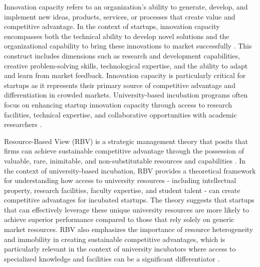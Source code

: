 \documentclass[../Main.tex]{subfiles}
\begin{document}
Innovation capacity refers to an organization's ability to generate, develop, and implement new ideas, products, services, or processes that create value and competitive advantage. In the context of startups, innovation capacity encompasses both the technical ability to develop novel solutions and the organizational capability to bring these innovations to market successfully \autocite{lawson2001developing, hurley1998innovation}. This construct includes dimensions such as research and development capabilities, creative problem-solving skills, technological expertise, and the ability to adapt and learn from market feedback. Innovation capacity is particularly critical for startups as it represents their primary source of competitive advantage and differentiation in crowded markets. University-based incubation programs often focus on enhancing startup innovation capacity through access to research facilities, technical expertise, and collaborative opportunities with academic researchers \autocite{grimaldi2005university}.

Resource-Based View (RBV) is a strategic management theory that posits that firms can achieve sustainable competitive advantage through the possession of valuable, rare, inimitable, and non-substitutable resources and capabilities \autocite{barney1991firm, wernerfelt1984resource}. In the context of university-based incubation, RBV provides a theoretical framework for understanding how access to university resources - including intellectual property, research facilities, faculty expertise, and student talent - can create competitive advantages for incubated startups. The theory suggests that startups that can effectively leverage these unique university resources are more likely to achieve superior performance compared to those that rely solely on generic market resources. RBV also emphasizes the importance of resource heterogeneity and immobility in creating sustainable competitive advantages, which is particularly relevant in the context of university incubators where access to specialized knowledge and facilities can be a significant differentiator \autocite{barney2001resource}.
\end{document}
